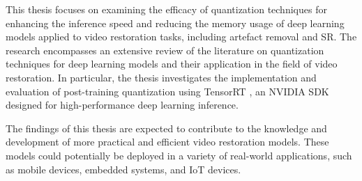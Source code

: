 This thesis focuses on examining the efficacy of quantization techniques for enhancing the inference speed and reducing the memory usage of deep learning models applied to video restoration tasks, including artefact removal and SR. The research encompasses an extensive review of the literature on quantization techniques for deep learning models and their application in the field of video restoration. In particular, the thesis investigates the implementation and evaluation of post-training quantization using TensorRT \cite{tensorrt}, an NVIDIA SDK designed for high-performance deep learning inference.

The findings of this thesis are expected to contribute to the knowledge and development of more practical and efficient video restoration models. These models could potentially be deployed in a variety of real-world applications, such as mobile devices, embedded systems, and IoT devices.
